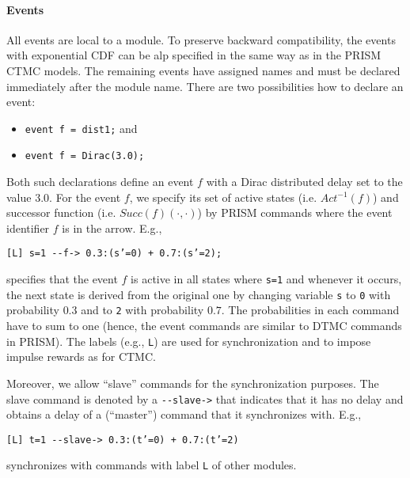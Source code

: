 \documentclass{article}
\renewcommand{\_}{\underline{~}}
\newcommand{\suc}{Succ}
\newcommand{\act}{Act}
\newcommand{\code}[1]{\texttt{#1}}
\begin{document}
\paragraph{Events}
All events are local to a module.
To preserve backward compatibility, the events with exponential CDF can be alp specified in the same way as in the PRISM CTMC models.
The remaining events have assigned names and must be declared immediately after the module name.
There are two possibilities how to declare an event:
\begin{itemize}
	\item \code{event f = dist1;} and
	\item \code{event f = Dirac(3.0);}
\end{itemize}
Both such declarations define an event $f$ with a Dirac distributed delay set to the value $3.0$.
For the event $f$, we specify its set of active states (i.e. $\act^{-1}(f)$) and successor function (i.e. $\suc(f)(\cdot,\cdot)$) by PRISM commands where the event identifier $f$ is in the arrow. 
E.g., 
\begin{center}
	\code{[L] s=1 {-}{-}f-> 0.3:(s'=0) + 0.7:(s'=2);}
\end{center}
specifies that the event $f$ is active in all states where \code{s=1} and whenever it occurs, the next state is derived from the original one by changing variable \code{s} to \code{0} with probability $0.3$ and to \code{2} with probability $0.7$. 
The probabilities in each command have to sum to one (hence, the event commands are similar to DTMC commands in PRISM). 
The labels (e.g., \code{L}) are used for synchronization and to impose impulse rewards as for CTMC.

Moreover, we allow ``slave'' commands for the synchronization purposes. 
The slave command is denoted by a \code{{-}{-}slave->} that indicates that it has no delay and obtains a delay of a (``master'') command that it synchronizes with.
E.g., 
\begin{center}
	\code{[L] t=1 {-}{-}slave-> 0.3:(t'=0) + 0.7:(t'=2)}
\end{center}
synchronizes with commands with label \code{L} of other modules.

\newpage
\end{document}
